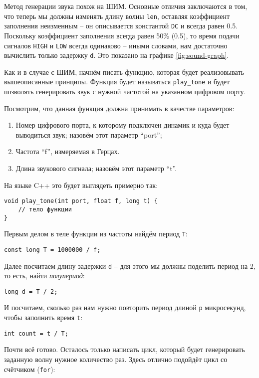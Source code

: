 \documentclass[../sparc.tex]{subfiles}
\begin{document}
Метод генерации звука похож на \gls{ШИМ}.  Основные отличия заключаются в том,
что теперь мы должны изменять длину волны \texttt{len}, оставляя коэффициент
заполнения неизменным -- он описывается константой \texttt{DC} и всегда равен
0.5.  Поскольку коэффициент заполнения всегда равен 50\% (0.5), то время подачи
сигналов \texttt{HIGH} и \texttt{LOW} всегда одинаково -- иными словами, нам
достаточно вычислить только задержку \texttt{d}.  Это показано на графике
\ref{fig:sound-graph}.

Как и в случае с ШИМ, начнём писать функцию, которая будет реализовывать
вышеописанные принципы. Функция будет называться \texttt{play\_tone} и будет
позволять генерировать звук с нужной частотой на указанном цифровом порту.

Посмотрим, что данная функция должна принимать в качестве параметров:
\begin{enumerate}
\item Номер цифрового порта, к которому подключен динамик и куда будет
  выводиться звук; назовём этот параметр ``port'';
\item Частота ``f'', измеряемая в Герцах.
\item Длина звукового сигнала; назовём этот параметр ``t''.
\end{enumerate}

На языке C++ это будет выглядеть примерно так:
\begin{verbatim}
void play_tone(int port, float f, long t) {
    // тело функции
}
\end{verbatim}

Первым делом в теле функции из частоты найдём период \texttt{T}:
\begin{verbatim}
const long T = 1000000 / f;
\end{verbatim}

Далее посчитаем длину задержки \texttt{d} -- для этого мы должны поделить период
на 2, то есть, найти \emph{полупериод}:
\begin{verbatim}
long d = T / 2;
\end{verbatim}

И посчитаем, сколько раз нам нужно повторить период длиной \texttt{p}
микросекунд, чтобы заполнить время \texttt{t}:
\begin{verbatim}
int count = t / T;
\end{verbatim}

Почти всё готово. Осталось только написать цикл, который будет генерировать
заданную волну нужное количество раз. Здесь отлично подойдёт цикл со счётчиком
(\texttt{for}):
\end{document}
